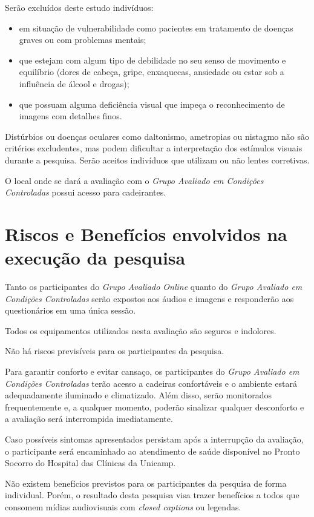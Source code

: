\documentclass[a4paper,11pt,titlepage,singlespacing]{article}
\begin{document}
Serão excluídos deste estudo indivíduos:

\begin{itemize}
\item em situação de vulnerabilidade como pacientes em tratamento de doenças graves ou com problemas mentais;
\item que estejam com algum tipo de debilidade no seu senso de movimento e equilíbrio (dores de cabeça, gripe, enxaquecas, ansiedade ou estar sob a influência de álcool e drogas);
\item que possuam alguma deficiência visual que impeça o reconhecimento de imagens com detalhes finos.
\end{itemize}

\noindent Distúrbios ou doenças oculares como daltonismo, ametropias ou nistagmo não são critérios excludentes, mas podem dificultar a interpretação dos estímulos visuais durante a pesquisa. Serão aceitos indivíduos que utilizam ou não lentes corretivas. 

O local onde se dará a avaliação com o \textit{Grupo Avaliado em Condições Controladas} possui acesso para cadeirantes.

\section{Riscos e Benefícios envolvidos na execução da pesquisa}
\noindent Tanto os participantes do \textit{Grupo Avaliado Online} quanto do \textit{Grupo Avaliado em Condições Controladas} serão expostos aos áudios e imagens e responderão aos questionários em uma única sessão.

Todos os equipamentos utilizados nesta avaliação são seguros e indolores. 

Não há riscos previsíveis para os participantes da pesquisa.

Para garantir conforto e evitar cansaço, os participantes do \textit{Grupo Avaliado em Condições Controladas} terão acesso a cadeiras confortáveis e o ambiente estará adequadamente iluminado e climatizado. Além disso, serão monitorados frequentemente e, a qualquer momento, poderão sinalizar qualquer desconforto e a avaliação será interrompida imediatamente. 

Caso possíveis sintomas apresentados persistam após a interrupção da avaliação, o participante será encaminhado ao atendimento de saúde disponível no Pronto Socorro do Hospital das Clínicas da Unicamp.

Não existem benefícios previstos para os participantes da pesquisa de forma individual. Porém, o resultado desta pesquisa visa trazer benefícios a todos que consomem mídias audiovisuais com \textit{closed captions} ou legendas.
\end{document}

